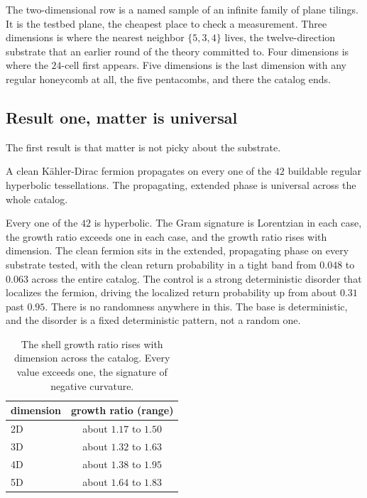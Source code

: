 The two-dimensional row is a named sample of an infinite family of plane tilings. It is the testbed plane, the cheapest place to check a measurement. Three dimensions is where the nearest neighbor $\{5,3,4\}$ lives, the twelve-direction substrate that an earlier round of the theory committed to. Four dimensions is where the $24$-cell first appears. Five dimensions is the last dimension with any regular honeycomb at all, the five pentacombs, and there the catalog ends.

\subsection{Result one, matter is universal}

The first result is that matter is not picky about the substrate.

\begin{result}
A clean K\"ahler-Dirac fermion propagates on every one of the $42$ buildable regular hyperbolic tessellations. The propagating, extended phase is universal across the whole catalog.
\end{result}

Every one of the $42$ is hyperbolic. The Gram signature is Lorentzian in each case, the growth ratio exceeds one in each case, and the growth ratio rises with dimension. The clean fermion sits in the extended, propagating phase on every substrate tested, with the clean return probability in a tight band from $0.048$ to $0.063$ across the entire catalog. The control is a strong deterministic disorder that localizes the fermion, driving the localized return probability up from about $0.31$ past $0.95$. There is no randomness anywhere in this. The base is deterministic, and the disorder is a fixed deterministic pattern, not a random one.

\begin{table}[ht]
\centering
\begin{tabular}{@{}lc@{}}
\toprule
dimension & growth ratio (range) \\
\midrule
2D & about $1.17$ to $1.50$ \\
3D & about $1.32$ to $1.63$ \\
4D & about $1.38$ to $1.95$ \\
5D & about $1.64$ to $1.83$ \\
\bottomrule
\end{tabular}
\caption{The shell growth ratio rises with dimension across the catalog. Every value exceeds one, the signature of negative curvature.}
\label{tab:growth-ratio}
\end{table}

